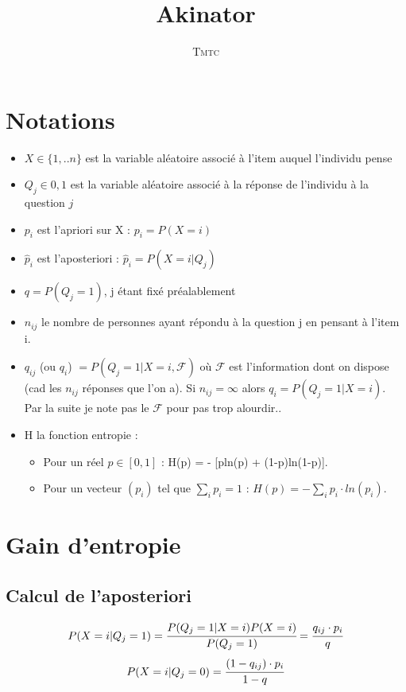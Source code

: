 \documentclass[12pt]{article}
\title{Akinator}
\author{\textsc{Tmtc}}
\begin{document}
\maketitle
\setcounter{tocdepth}{2}
\tableofcontents
\clearpage

\section{Notations}
\begin{itemize}
	\item $X \in \{1,.. n\}$ est la variable aléatoire associé à l'item auquel l'individu pense
	\item $Q_j \in {0,1}$ est la variable aléatoire associé à la réponse de l'individu à la question $j$
	\item $p_i$ est l'apriori sur X : $p_i = P(X = i)$
	\item $\hat{p}_i$ est l'aposteriori  : $\hat{p}_i = P(X=i | Q_j)$
	\item $q = P(Q_j = 1)$, j étant fixé préalablement
	\item $n_{ij}$ le nombre de personnes ayant répondu à la question j en pensant à l'item i. 
	\item $q_{ij}$ (ou $q_i$) $= P(Q_j = 1 | X = i, \mathcal{F})$ où $\mathcal{F}$ est l'information dont on dispose (cad les $n_{ij}$ réponses que l'on a). Si $n_{ij} = \infty$ alors $q_i = P(Q_j = 1 | X = i)$. Par la suite je note pas le $\mathcal{F}$ pour pas trop alourdir.. 
	\item H la fonction entropie : 
		\begin{itemize}
			\item Pour un réel $p \in [0,1]$ : H(p) = - [pln(p) + (1-p)ln(1-p)]. 
			\item Pour un vecteur $(p_i)$ tel que $\sum_i p_i = 1$ : $H(p) = -\sum_i p_i\cdot ln(p_i)$. 
		\end{itemize}
\end{itemize}

\section{Gain d'entropie}

\subsection{Calcul de l'aposteriori}
 
 \[P(X = i | Q_j = 1) = \cfrac{P(Q_j = 1 | X = i)P(X = i)}{P(Q_j = 1)} = \cfrac{q_{ij}\cdot p_i}{q}\]
\[ P(X = i | Q_j = 0) = \cfrac{(1-q_{ij})\cdot p_i}{1-q}\]
\end{document}
